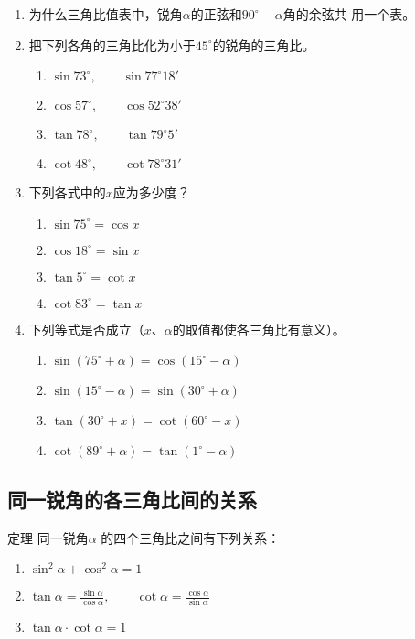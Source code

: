 \begin{ex}
    \begin{enumerate}
        \item 为什么三角比值表中，锐角$\alpha$的正弦和$90^{\circ}-\alpha$角的余弦共
        用一个表。
\item 把下列各角的三角比化为小于$45^{\circ}$的锐角的三角比。
\begin{multicols}{2}
\begin{enumerate}
    \item $\sin73^{\circ},\qquad \sin77^{\circ}18'$
    \item $\cos57^{\circ},\qquad \cos52^{\circ}38'$
    \item $\tan78^{\circ},\qquad \tan79^{\circ}5'$
    \item $\cot48^{\circ},\qquad \cot78^{\circ}31'$
\end{enumerate}
\end{multicols}
\item 下列各式中的$x$应为多少度？
\begin{multicols}{2}
\begin{enumerate}
    \item $\sin75^{\circ}=\cos x$
    \item $\cos18^{\circ}=\sin x$
    \item $\tan5^{\circ}=\cot x$
    \item $\cot83^{\circ}=\tan x$
\end{enumerate}
\end{multicols}
\item 下列等式是否成立（$x$、$\alpha$的取值都使各三角比有意义）。
\begin{multicols}{2}
\begin{enumerate}
    \item $\sin(75^{\circ}+\alpha )=\cos(15^{\circ}-\alpha )$
    \item $\sin(15^{\circ}-\alpha )=\sin(30^{\circ}+\alpha )$
    \item $ \tan (30^{\circ}+x)=\cot (60^{\circ}-x)$
    \item $ \cot (89^{\circ}+\alpha )=\tan (1^{\circ}-\alpha )$
\end{enumerate}
\end{multicols}
    \end{enumerate}
\end{ex}

\subsection{同一锐角的各三角比间的关系}
\begin{blk}{定理}
    同一锐角$\alpha$ 的四个三角比之间有下列关系：
\begin{enumerate}
    \item $\sin^2\alpha  +\cos^2\alpha =1$
    \item $\tan\alpha=\frac{\sin\alpha}{\cos\alpha },\qquad \cot\alpha=\frac{\cos\alpha }{\sin\alpha }$
    \item $\tan\alpha\cdot \cot\alpha =1$
\end{enumerate}
\end{blk}

